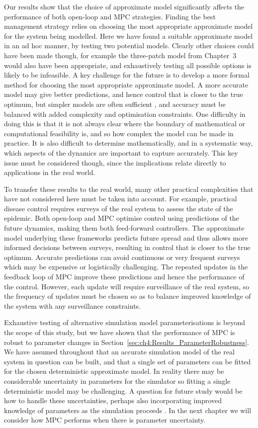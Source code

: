 Our results show that the choice of approximate model significantly affects the performance of both open-loop and MPC strategies. Finding the best management strategy relies on choosing the most appropriate approximate model for the system being modelled. Here we have found a suitable approximate model in an ad hoc manner, by testing two potential models. Clearly other choices could have been made though, for example the three-patch model from Chapter~3 would also have been appropriate, and exhaustively testing all possible options is likely to be infeasible. A key challenge for the future is to develop a more formal method for choosing the most appropriate approximate model. A more accurate model may give better predictions, and hence control that is closer to the true optimum, but simpler models are often sufficient \citep{thompson_effect_2018}, and accuracy must be balanced with added complexity and optimisation constraints. One difficulty in doing this is that it is not always clear where the boundary of mathematical or computational feasibility is, and so how complex the model can be made in practice. It is also difficult to determine mathematically, and in a systematic way, which aspects of the dynamics are important to capture accurately. This key issue must be considered though, since the implications relate directly to applications in the real world.

To transfer these results to the real world, many other practical complexities that have not considered here must be taken into account. For example, practical disease control requires surveys of the real system to assess the state of the epidemic. Both open-loop and MPC optimise control using predictions of the future dynamics, making them both feed-forward controllers. The approximate model underlying these frameworks predicts future spread and thus allows more informed decisions between surveys, resulting in control that is closer to the true optimum. Accurate predictions can avoid continuous or very frequent surveys which may be expensive or logistically challenging. The repeated updates in the feedback loop of MPC improve these predictions and hence the performance of the control. However, each update will require surveillance of the real system, so the frequency of updates must be chosen so as to balance improved knowledge of the system with any surveillance constraints.

Exhaustive testing of alternative simulation model parameterisations is beyond the scope of this study, but we have shown that the performance of MPC is robust to parameter changes in Section~\ref{sec:ch4:Results_ParameterRobustness}. We have assumed throughout that an accurate simulation model of the real system in question can be built, and that a single set of parameters can be fitted for the chosen deterministic approximate model. In reality there may be considerable uncertainty in parameters for the simulator so fitting a single deterministic model may be challenging. A question for future study would be how to handle these uncertainties, perhaps also incorporating improved knowledge of parameters as the simulation proceeds \citep{thompson_control_2018}. In the next chapter we will consider how MPC performs when there is parameter uncertainty.

